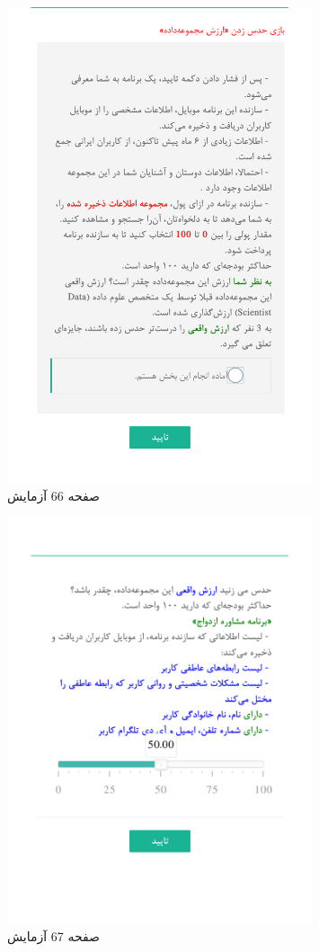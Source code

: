 { 
\begin{figure}[htpb]
\centering
\includegraphics[width=0.8\textwidth]{./img/Task66.png/}
\caption{ صفحه 66 آزمایش }
\label{fig:Task66}
\end{figure}
 
 
\begin{figure}[htpb]
\centering
\includegraphics[width=0.8\textwidth]{./img/Task67.png/}
\caption{ صفحه 67 آزمایش }
\label{fig:Task67}
\end{figure}
 
}
